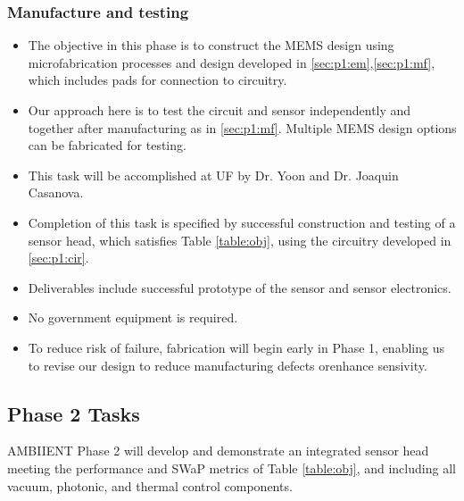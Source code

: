 \subsubsection{Manufacture and testing}
\begin{itemize}
\item The objective in this phase is to construct the MEMS design using microfabrication processes and design developed in \ref{sec:p1:em},\ref{sec:p1:mf}, which includes pads for connection to circuitry.
\item Our approach here is to test the circuit and sensor independently and together after manufacturing as in \ref{sec:p1:mf}. Multiple MEMS design options can be fabricated for testing.
\item This task will be accomplished at UF by Dr. Yoon and Dr. Joaquin Casanova.
\item Completion of this task is specified by successful construction and testing of a sensor head, which satisfies Table \ref{table:obj}, using the circuitry developed in \ref{sec:p1:cir}.
\item Deliverables include successful prototype of the sensor and sensor electronics.
\item No government equipment is required.
\item To reduce risk of failure, fabrication will begin early in Phase 1, enabling us to revise our design to reduce manufacturing defects orenhance sensivity. 
\end{itemize}

\subsection{Phase 2 Tasks}
  
AMBIIENT Phase 2 will develop and demonstrate an integrated sensor head meeting the
performance and SWaP metrics of Table \ref{table:obj}, and including all vacuum, photonic, and thermal
control components.

